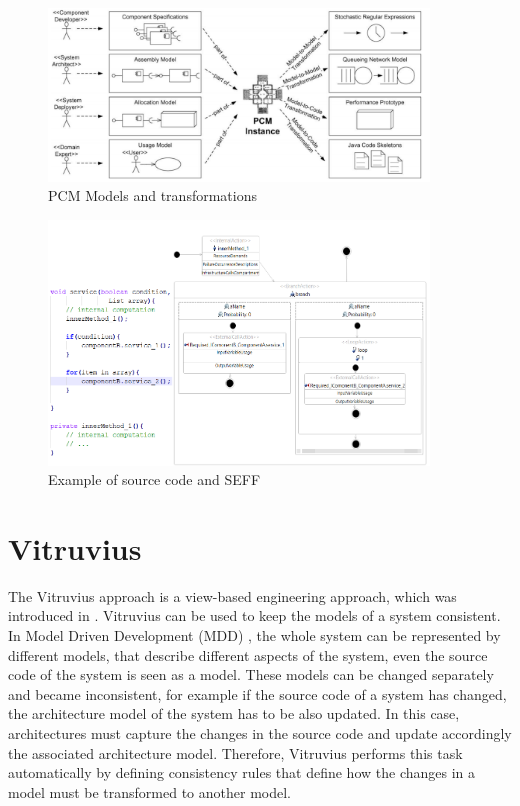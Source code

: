 \begin{figure}[h]
\centering
\includegraphics[width=0.9\textwidth]{figures/pcmmodels}
\caption{PCM Models and transformations}
\label{fig:PCM Models and transformations}
\end{figure}

\begin{figure}[h]
\centering
\includegraphics[width=0.9\textwidth]{figures/code_seff}
\caption{Example of source code and SEFF}
\label{fig:Example of source code and SEFF}
\end{figure}


\section{Vitruvius}
\label{sec:Vitruvius}

The Vitruvius approach is a view-based \cite{goldschmidt2012view} engineering approach, which was introduced in \cite{burger2013flexible, kramer2013view}.  Vitruvius can be used to keep the models of a system consistent. In Model Driven Development (MDD) \cite{thomas2005erzeugung, schmidt2006erzeugung}, the whole system can be represented by different models, that describe different aspects of the system, even the source code of the system is seen as a model. These models can be changed separately and became inconsistent, for example if the source code of a system has changed, the architecture model of the system has to be also updated. In this case, architectures must capture the changes in the source code and update accordingly the associated architecture model. Therefore, Vitruvius performs this task automatically by defining consistency rules that define how the changes in a model must be transformed to another model.\\

